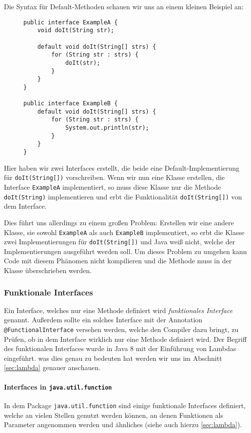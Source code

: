		Die Syntax für Default-Methoden schauen wir uns an einem kleinen Beispiel an:
		\begin{figure}[H]
			\centering
			\begin{lstlisting}
public interface ExampleA {
	void doIt(String str);

	default void doIt(String[] strs) {
		for (String str : strs) {
			doIt(str);
		}
	}
}

public interface ExampleB {
	default void doIt(String[] strs) {
		for (String str : strs) {
			System.out.println(str);
		}
	}
}
\end{lstlisting}
		\end{figure}
		Hier haben wir zwei Interfaces erstellt, die beide eine Default-Implementierung für \lstinline|doIt(String[])| vorschreiben. Wenn wir nun eine Klasse erstellen, die Interface \lstinline|ExampleA| implementiert, so muss diese Klasse nur die Methode \lstinline|doIt(String)| implementieren und erbt die Funktionalität \lstinline|doIt(String[])| von dem Interface.
		
		Dies führt uns allerdings zu einem großen Problem: Erstellen wir eine andere Klasse, sie sowohl \lstinline|ExampleA| als auch \lstinline|ExampleB| implementiert, so erbt die Klasse zwei Implementierungen für \lstinline|doIt(String[])| und Java weiß nicht, welche der Implementierungen ausgeführt werden soll. Um dieses Problem zu umgehen kann Code mit diesem Phänomen nicht kompilieren und die Methode muss in der Klasse überschrieben werden.
	
	\subsubsection{Funktionale Interfaces}
		Ein Interface, welches nur eine Methode definiert wird \textit{funktionales Interface} genannt. Außerdem sollte ein solches Interface mit der Annotation \lstinline|@FunctionalInterface| versehen werden, welche den Compiler dazu bringt, zu Prüfen, ob in dem Interface wirklich nur eine Methode definiert wird. Der Begriff des funktionalen Interfaces wurde in Java 8 mit der Einführung von Lambdas eingeführt. was dies genau zu bedeuten hat werden wir uns im Abschnitt \ref{sec:lambda} genauer anschauen.
		
		\paragraph{Interfaces in \texttt{java.util.function}}
			In dem Package \lstinline|java.util.function| sind einige funktionale Interfaces definiert, welche an vielen Stellen genutzt werden können, an denen Funktionen als Parameter angenommen werden und ähnliches (siehe auch hierzu \ref{sec:lambda}).
			
